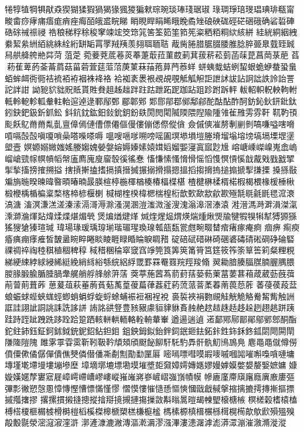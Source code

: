 犈犉犆犅犋猒猋猰猢猱猳猧猲猭猦猣猵猌琮琬琰琫琖琚琡
琭琱琤琣琝琩琠琲瓻甯畯畬痧痚痡痦痝痟痤痗皕皒盚睆睇
睄睍睅睊睎睋睌矞矬硠硤硥硜硭硱硪确硰硩硨硞硢祴祳祲
祰稂稊稃稌稄窙竦竤筊筇筄筈筌筎筀筘筅粢粞粨粡絘絯絣
絓絖絧絪絏絭絜絫絒絔絩絑絟絎缾缿罥罦羢羠羡翗聑聏聐
胾胔腃腊腒腏腇脽腍脺臦臮臷臸臹舄舼舽舿艵茻菏菹萣
菀菨萒菧菤菼菶萐菆菈菫菣莿萁菝菥菘菿菡菋菎菖菵菉萉
萏菞萑萆菂菳菕菺菇菑菪萓莚菃菬菮菄菻菗菢萛菛菾蛘
蛢蛦蛓蛣蛚蛪蛝蛫蛜蛬蛩蛗蛨蛑衈衖衕袺裗袹袸裀袾袶袼
袷袽袲褁裉覕覘覗觝觚觛詎詍訹詙詀詗詘詄詅詒詈詑詊詌
詏豟貁貀貺貾貰貹貵趄趀趉跘跓跍跇跖跜跏跕跙跈跗跅軯
軷軺軹軦軮軥軵軧軨軶軫軱軬軴軩逭逴逯鄆鄬鄄郿郼鄈
郹郻鄁鄀鄇鄅鄃酡酤酟酢酠鈁鈊鈥鈃鈚鈦鈏鈌鈀鈒釿釽鈆
鈄鈧鈂鈜鈤鈙鈗鈅鈖镻閍閌閐隇陾隈隉隃隀雂雈雃雱雰靬
靰靮頇颩飫鳦⿋黹亃亄亶傽傿僆傮僄僊傴僈僂傰僁傺傱僋
僉傶傸凗剺剸剻剼嗃嗛嗌嗐嗋嗊嗝嗀嗀嗔嗄嗩喿嗒喍嗏嗕
嗢嗖嗈嗲嗍嗙嗂圔塓塨塤塏塍塉塯塕塎塝塙塥塛堽塣塱壼
嫇嫄嫋媺媸媱媵媰媿嫈媻嫆媷嫀嫊媴媶嫍媹媐寖寘寙尟尳
嵱嵣嵊嵥嵲嵬嵞嵨嵧嵢巰幏幎幊幍幋廅廌廆廋廇彀徯徭惷
慉慊愫慅愶愲愮慆愯慏愩慀戠酨戣戥戤揅揱揫搐搒搉搠搤
搳摃搟搕搘搹搷搢搣搌搦搰搨摁搵搯搊搚摀搥搧搋揧搛搮
搡搎敯斒旓暆暌暕暐暋暊暙暔晸朠楦楟椸楎楢楱椿楅楪椹
楂楗楙楺楈楉椵楬椳椽楥棰楸椴楩楀楯楄楶楘楁楴楌椻楋
椷楜楏楑椲楒椯楻椼歆歅歃歂歈歁殛毻毼毹毷毸溛滖滈溏
滀溟溓溔溠溱溹滆滒溽滁溞滉溷溰滍溦滏溲溾滃滜滘溙溒
溎溍溤溡溿溳滐滊溗溮溣煇煔煒煣煠煁煝煢煲煸煪煡煂
煘煃煋煰煟煐煓煄煍煚牏犍犌犑犐犎猼獂猻猺獀獊獉瑄瑊
瑋瑒瑑瑗瑀瑏瑐瑎瑂瑆瑍瑔瓡瓿瓾瓽甝畹畷榃痯瘏瘃痷痾
痼痹痸瘐痻痶痭痵痽皙皵盝睕睟睠睒睖睚睩睧睔睙睭矠
碇碚碔碏碄碕碅碆碡碃硹碙碀碖硻祼禂祽祹稑稘稙稒稗稕
稢稓稛稐窣窢窞竫筦筤筭筴筩筲筥筳筱筰筡筸筶筣粲粴粯
綈綆綀綍絿綅絺綎絻綃絼綌綔綄絽綒罭罫罧罨罬羦羥羧翛
翜耡腤腠腷腜腩腛腢腲朡腞腶腧腯腄腡舝艉艄艀艂艅蓱萿
葖葶葹蒏蒍葥葑葀蒆葧萰葍葽葚葙葴葳葝蔇葞萷萺萴葺葃
葸萲葅萩菙葋萯葂萭葟葰萹葎葌葒葯蓅蒎萻葇萶萳葨葾葄
萫葠葔葮葐蜋蜄蛷蜌蛺蛖蛵蝍蛸蜎蜉蜁蛶蜍蜅裖裋裍裎裞
裛裚裌裐覅覛觟觥觤觡觠觢觜触詶誆詿詡訿詷誂誄詵誃誁
詴詺谼豋豊豥豤豦貆貄貅賌赨赩趑趌趎趏趍趓趔趐趒跰跠
跬跱跮跐跩跣跢跧跲跫跴輆軿輁輀輅輇輈輂輋遒逿遄遉
逽鄐鄍鄏鄑鄖鄔鄋鄎酮酯鉈鉒鈰鈺鉦鈳鉥鉞銃鈮鉊鉆鉭鉬
鉏鉠鉧鉯鈶鉡鉰鈱鉔鉣鉐鉲鉎鉓鉌鉖鈲閟閜閞閛隒隓隑隗
雎雺雽雸雵靳靷靸靲頏頍頎颬飶飹馯馲馰馵骭骫魛鳪鳭鳧
麀⿌黽僦僔僗僨僳僛僪僝僤僓僬僰僯僣僠凘劀劁勩勫匰厬
嘧嘕嘌嘒嗼嘏嘜嘁嘓嘂嗺嘝嘄嗿嗹墉塼墐墘墆墁塿塴墋塺
墇墑墎塶墂墈塻墔墏壾奫嫜嫮嫥嫕嫪嫚嫭嫫嫳嫢嫠嫛嫬嫞
嫝嫙嫨嫟孷寠寣屣嶂嶀嵽嶆嵺嶁嵷嶊嶉嶈嵾嵼嶍嵹嵿幘幙
幓廘廑廗廎廜廕廙廒廔彄彃彯徶愬愨慁慞慱慳慒慓慲慬憀
慴慔慺慛慥愻慪慡慖戩戧戫搫摍摛摝摴摶摲摳摽摵摦撦摎
撂摞摜摋摓摠摐摿搿摬摫摙摥摷敳斠暡暠暟朅朄朢榱榶槉
榠槎榖榰榬榼榑榙榎榧榍榩榾榯榿槄榽榤槔榹槊榚槏榳榓
榪榡榞槙榗榐槂榵榥槆歊歍歋殞殟殠毃毄毾滎滵滱漃漥滸
漷滻漮漉潎漙漚漧漘漻漒滭漊漶潳滹滮漭潀漰漼漵滫漇漎
